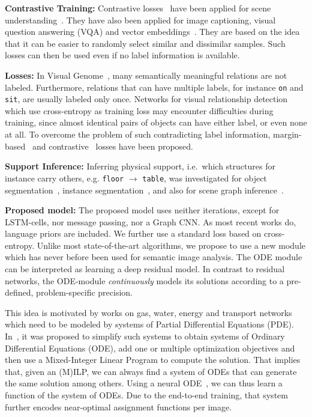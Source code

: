 \documentclass[runningheads]{llncs}
\begin{document}
\noindent \textbf{Contrastive Training:} Contrastive losses~\cite{arora2019theoretical} have been applied for scene understanding~\cite{Zhang2019:GCL}. They have also been applied for image captioning, visual question answering (VQA) and vector embeddings~\cite{yang2018shuffle,nagaraja2016modeling,rohrbach2016grounding}. They are based on the idea that it can be easier to randomly select similar and dissimilar samples. Such losses can then be used even if no label information is available.

\noindent \textbf{Losses:} In Visual Genome~\cite{krishna2017visual}, many semantically meaningful relations are not labeled. Furthermore, relations that can have multiple labels, for instance \texttt{on} and \texttt{sit}, are usually labeled only once. Networks for visual relationship detection which use cross-entropy as training loss may encounter difficulties during training, since almost identical pairs of objects can have either label, or even none at all. 
To overcome the problem of such contradicting label information, margin-based~\cite{krishnaswamy2019combining} and contrastive~\cite{Zhang2019:GCL} losses have been proposed.

\noindent \textbf{Support Inference:} Inferring physical support, i.e.~which structures for instance carry others, e.g. \texttt{floor} $\rightarrow$ \texttt{table}, was investigated for object segmentation~\cite{Silberman2012:SupportInference}, instance segmentation~\cite{zhuo2017indoor}, and also for scene graph inference~\cite{yang2017support}.

\noindent \textbf{Proposed model:} The proposed model uses neither iterations, except for LSTM-cells, nor message passing, nor a Graph CNN. As most recent works do, language priors are included. We further use a standard loss based on cross-entropy. Unlike most state-of-the-art algorithms, we propose to use a new module which has never before been used for semantic image analysis. The ODE module~\cite{Chen2018:NODE} can be interpreted as learning a deep residual model. In contrast to residual networks, the ODE-module \emph{continuously} models its solutions according to a pre-defined, problem-specific precision. 

This idea is motivated by works on gas, water, energy and transport networks which need to be modeled by systems of Partial Differential Equations (PDE). In~\cite{Fuegenschuh2006:CombinatorialModels}, it was proposed to simplify such systems to obtain systems of Ordinary Differential Equations (ODE), add one or multiple optimization objectives and then use a Mixed-Integer Linear Program to compute the solution. That implies that, given an (M)ILP, we can always find a system of ODEs that can generate the same solution among others. Using a neural ODE~\cite{Chen2018:NODE}, we can thus learn a function of the system of ODEs. Due to the end-to-end training, that system further encodes  near-optimal assignment functions per image.
\end{document}
